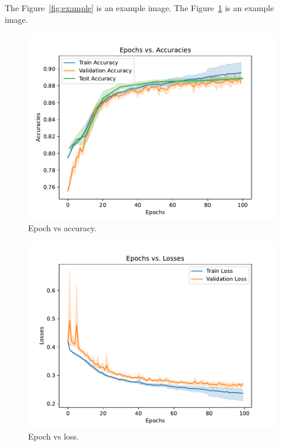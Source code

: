 \documentclass[sigplan,screen]{acmart}
\begin{document}


The Figure~\ref{fig:example} is an example image.
The Figure~\ref{fig:epochs-vs-accuracy-a} is an example image.

\begin{figure}[htb]
\centering\includegraphics[width=1.0\columnwidth]{images/epoch_vs_accuracy.pdf}
\caption{Epoch vs accuracy.}
\label{fig:epochs-vs-accuracy-a}
\end{figure}


\begin{figure}[htb]
\centering\includegraphics[width=1.0\columnwidth]{images/epoch_vs_loss.pdf}
\caption{Epoch vs loss.}
\label{fig:epochs-vs-accuracy-b}
\end{figure}
\end{document}
